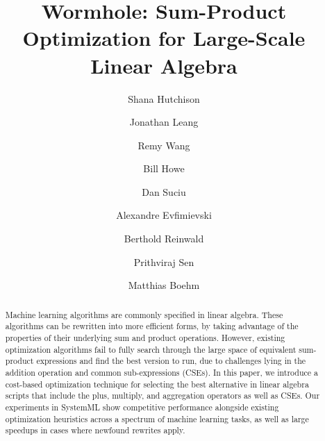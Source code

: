 \documentclass[sigconf,10pt]{acmart}
\begin{document}
\title{Wormhole: Sum-Product Optimization for Large-Scale Linear Algebra}
\author{Shana Hutchison}%
\author{Jonathan Leang}
\author{Remy Wang}
\author{Bill Howe}
\author{Dan Suciu}
\author{Alexandre Evfimievski}
\author{Berthold Reinwald}
\author{Prithviraj Sen}
\author{Matthias Boehm}

\renewcommand{\shortauthors}{Hutchison, Leang, Howe, Suciu, Evfimievskit, Reinwald, Sen, Boehm}

\begin{abstract}
Machine learning algorithms are commonly specified in linear algebra.
These algorithms can be rewritten into more efficient forms, 
by taking advantage of the properties of their underlying sum 
and product operations.
However, existing optimization algorithms fail to fully search through the large space of equivalent sum-product expressions and find the best version to run, due to challenges lying in the addition operation and common sub-expressions (CSEs).
In this paper, we introduce a cost-based optimization technique for selecting the best alternative in linear algebra scripts that include the plus, multiply, and aggregation operators as well as CSEs.
Our experiments in SystemML show competitive performance alongside existing optimization heuristics across a spectrum of machine learning tasks, as well as large speedups in cases where newfound rewrites apply.
\end{abstract}
 
\end{document}
